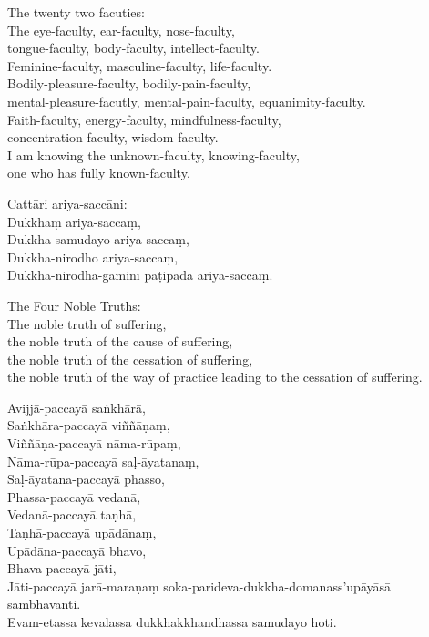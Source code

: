 \begin{english}
  The twenty two facuties:\\
  The eye-faculty, ear-faculty, nose-faculty,\\
  tongue-faculty, body-faculty, intellect-faculty.\\
  Feminine-faculty, masculine-faculty, life-faculty.\\
  Bodily-pleasure-faculty, bodily-pain-faculty,\\
  mental-pleasure-facutly, mental-pain-faculty, equanimity-faculty.\\
  Faith-faculty, energy-faculty, mindfulness-faculty,\\
  concentration-faculty, wisdom-faculty.\\
  I am knowing the unknown-faculty, knowing-faculty,\\
  one who has fully known-faculty.
\end{english}

Cattāri ariya-saccāni:\\
Dukkhaṃ ariya-saccaṃ,\\
Dukkha-samudayo ariya-saccaṃ,\\
Dukkha-nirodho ariya-saccaṃ,\\
Dukkha-nirodha-gāminī paṭipadā ariya-saccaṃ.

\begin{english}
  The Four Noble Truths:\\
  The noble truth of suffering,\\
  the noble truth of the cause of suffering,\\
  the noble truth of the cessation of suffering,\\
  the noble truth of the way of practice leading to the cessation of suffering.
\end{english}

Avijjā-paccayā saṅkhārā,\\
Saṅkhāra-paccayā viññāṇaṃ,\\
Viññāṇa-paccayā nāma-rūpaṃ,\\
Nāma-rūpa-paccayā saḷ-āyatanaṃ,\\
Saḷ-āyatana-paccayā phasso,\\
Phassa-paccayā vedanā,\\
Vedanā-paccayā taṇhā,\\
Taṇhā-paccayā upādānaṃ,\\
Upādāna-paccayā bhavo,\\
Bhava-paccayā jāti,\\
Jāti-paccayā jarā-maraṇaṃ soka-parideva-dukkha-domanass'upāyāsā sambhavanti.\\
Evam-etassa kevalassa dukkhakkhandhassa samudayo hoti.

